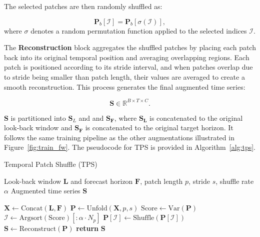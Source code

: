 The selected patches are then randomly shuffled as:

\begin{equation} \label{eq: patchshuffling}
\mathbf{P}_b[\mathcal{I}] = \mathbf{P}_b[\sigma(\mathcal{I})],
\end{equation}
where $\sigma$ denotes a random permutation function applied to the selected indices $\mathcal{I}$.

The \textbf{Reconstruction} block aggregates the shuffled patches by placing each patch back into its original temporal position and averaging overlapping regions. Each patch is positioned according to its stride interval, and when patches overlap due to stride being smaller than patch length, their values are averaged to create a smooth reconstruction. This process generates the final augmented time series: 

\begin{equation}
\mathbf{S} \in \mathbb{R}^{B \times T \times C}.
\end{equation}


$\mathbf{S}$ is partitioned into $\mathbf{S}_L$ and and $\mathbf{S_F}$, where $\mathbf{S_L}$ is concatenated to the original look-back window and $\mathbf{S_F}$ is concatenated to the original target horizon. It follows the same training pipeline as the other augmentations illustrated in Figure~\ref{fig:train_fw}. The pseudocode for TPS is provided in Algorithm~\ref{alg:tps}. 

\begin{algorithm}[H]
\caption{Temporal Patch Shuffle (TPS)}
\label{alg:tps}
\begin{algorithmic}[1]
\REQUIRE Look-back window $\mathbf{L}$ and forecast horizon $\mathbf{F}$, patch length $p$, stride $s$, shuffle rate $\alpha$
\ENSURE Augmented time series $\mathbf{S}$

\STATE $\mathbf{X} \gets \text{Concat}(\mathbf{L}, \mathbf{F})$ 
\STATE $\mathbf{P} \gets \text{Unfold}(\mathbf{X}, p, s)$ 
\STATE $\text{Score} \gets \text{Var}(\mathbf{P})$ 
\STATE $\mathcal{I} \gets \text{Argsort}(\text{Score})[:\alpha \cdot N_p]$ 
\STATE $\mathbf{P}[\mathcal{I}] \gets \text{Shuffle}(\mathbf{P}[\mathcal{I}])$  \label{alg: shuffle_patches}
\STATE $\mathbf{S} \gets \text{Reconstruct}(\mathbf{P})$ 
\STATE \textbf{return} $\mathbf{S}$
\end{algorithmic}
\end{algorithm}





